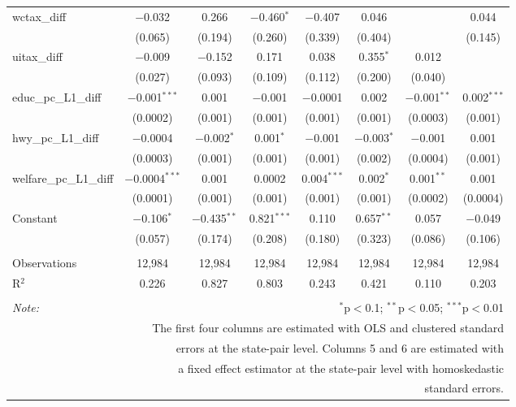 \begin{table}[!htbp]
\begin{tabular}{@{\extracolsep{5pt}}lccccccc}
  wctax\_diff & $-$0.032 & 0.266 & $-$0.460$^{*}$ & $-$0.407 & 0.046 &  & 0.044 \\ 
  & (0.065) & (0.194) & (0.260) & (0.339) & (0.404) &  & (0.145) \\ 
  uitax\_diff & $-$0.009 & $-$0.152 & 0.171 & 0.038 & 0.355$^{*}$ & 0.012 &  \\ 
  & (0.027) & (0.093) & (0.109) & (0.112) & (0.200) & (0.040) &  \\ 
  educ\_pc\_L1\_diff & $-$0.001$^{***}$ & 0.001 & $-$0.001 & $-$0.0001 & 0.002 & $-$0.001$^{**}$ & 0.002$^{***}$ \\ 
  & (0.0002) & (0.001) & (0.001) & (0.001) & (0.001) & (0.0003) & (0.001) \\ 
  hwy\_pc\_L1\_diff & $-$0.0004 & $-$0.002$^{*}$ & 0.001$^{*}$ & $-$0.001 & $-$0.003$^{*}$ & $-$0.001 & 0.001 \\ 
  & (0.0003) & (0.001) & (0.001) & (0.001) & (0.002) & (0.0004) & (0.001) \\ 
  welfare\_pc\_L1\_diff & $-$0.0004$^{***}$ & 0.001 & 0.0002 & 0.004$^{***}$ & 0.002$^{*}$ & 0.001$^{**}$ & 0.001 \\ 
  & (0.0001) & (0.001) & (0.001) & (0.001) & (0.001) & (0.0002) & (0.0004) \\ 
  Constant & $-$0.106$^{*}$ & $-$0.435$^{**}$ & 0.821$^{***}$ & 0.110 & 0.657$^{**}$ & 0.057 & $-$0.049 \\ 
  & (0.057) & (0.174) & (0.208) & (0.180) & (0.323) & (0.086) & (0.106) \\ 
 \hline \\[-1.8ex] 
Observations & 12,984 & 12,984 & 12,984 & 12,984 & 12,984 & 12,984 & 12,984 \\ 
R$^{2}$ & 0.226 & 0.827 & 0.803 & 0.243 & 0.421 & 0.110 & 0.203 \\ 
\hline 
\hline \\[-1.8ex] 
\textit{Note:}  & \multicolumn{7}{r}{$^{*}$p$<$0.1; $^{**}$p$<$0.05; $^{***}$p$<$0.01} \\ 
 & \multicolumn{7}{r}{The first four columns are estimated with OLS and clustered standard} \\ 
 & \multicolumn{7}{r}{ errors at the state-pair level. Columns 5 and 6 are estimated with} \\ 
 & \multicolumn{7}{r}{a fixed effect estimator at the state-pair level with homoskedastic} \\ 
 & \multicolumn{7}{r}{standard errors.} \\ 
\end{tabular} 
\end{table} 
